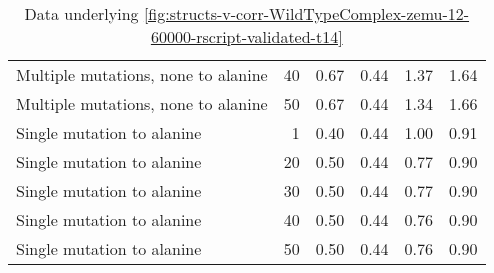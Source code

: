 \begin{table}
\begin{tabular}{lrrrrr}
 Multiple mutations, none to alanine &            40 &          0.67 &                    0.44 &            1.37 &                      1.64 \\
 Multiple mutations, none to alanine &            50 &          0.67 &                    0.44 &            1.34 &                      1.66 \\
          Single mutation to alanine &             1 &          0.40 &                    0.44 &            1.00 &                      0.91 \\
          Single mutation to alanine &            20 &          0.50 &                    0.44 &            0.77 &                      0.90 \\
          Single mutation to alanine &            30 &          0.50 &                    0.44 &            0.77 &                      0.90 \\
          Single mutation to alanine &            40 &          0.50 &                    0.44 &            0.76 &                      0.90 \\
          Single mutation to alanine &            50 &          0.50 &                    0.44 &            0.76 &                      0.90 \\
\bottomrule
\end{tabular}

\caption[]{Data underlying \cref{fig:structs-v-corr-WildTypeComplex-zemu-12-60000-rscript-validated-t14}}
\label{tab:structs-v-corr-WildTypeComplex-zemu-12-60000-rscript-validated-t14-underlying-data}
\end{table}
